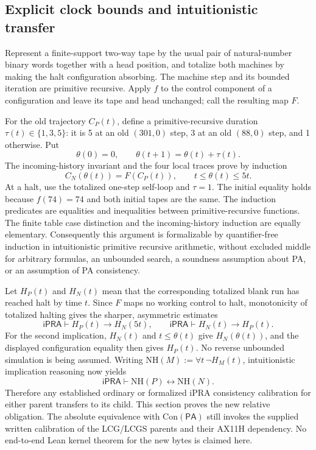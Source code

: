 \subsection{Explicit clock bounds and intuitionistic transfer}
Represent a finite-support two-way tape by the usual pair of natural-number
binary words together with a head position, and totalize both machines by
making the halt configuration absorbing.  The machine step and its bounded
iteration are primitive recursive.  Apply $f$ to the control component of
a configuration and leave its tape and head unchanged; call the resulting
map $F$.

For the old trajectory $C_P(t)$, define a primitive-recursive duration
$\tau(t)\in\{1,3,5\}$: it is 5 at an old $(301,0)$ step, 3 at an old
$(88,0)$ step, and 1 otherwise.  Put
\[
 \theta(0)=0,\qquad \theta(t+1)=\theta(t)+\tau(t).
\]
The incoming-history invariant and the four local traces prove by induction
\[
 C_N(\theta(t))=F(C_P(t)),\qquad t\leq\theta(t)\leq5t.
\]
At a halt, use the totalized one-step self-loop and $\tau=1$.
The initial equality holds because $f(74)=74$ and both initial tapes are
the same.  The induction predicates are equalities and inequalities between
primitive-recursive functions.  The finite table case distinction and the
incoming-history induction are equally elementary.  Consequently this
argument is formalizable by quantifier-free induction in intuitionistic
primitive recursive arithmetic, without excluded middle for arbitrary
formulas, an unbounded search, a soundness assumption about PA, or an
assumption of PA consistency.

Let $H_P(t)$ and $H_N(t)$ mean that the corresponding totalized blank run
has reached halt by time $t$.  Since $F$ maps no working control to halt,
monotonicity of totalized halting gives the sharper, asymmetric estimates
\[
 \mathsf{iPRA}\vdash H_P(t)\to H_N(5t),\qquad
 \mathsf{iPRA}\vdash H_N(t)\to H_P(t).
\]
For the second implication, $H_N(t)$ and $t\leq\theta(t)$ give
$H_N(\theta(t))$, and the displayed configuration equality then gives
$H_P(t)$.  No reverse unbounded simulation is being assumed.
Writing $\mathrm{NH}(M):=\forall t\,\neg H_M(t)$, intuitionistic implication
reasoning now yields
\[
 \mathsf{iPRA}\vdash\mathrm{NH}(P)\leftrightarrow\mathrm{NH}(N).
\]
Therefore any established ordinary or formalized iPRA consistency
calibration for either parent transfers to its child.  This section proves
the new relative obligation.  The absolute equivalence with
$\mathrm{Con}(\mathsf{PA})$ still invokes the supplied written calibration
of the LCG/LCGS parents and their AX11H dependency.  No end-to-end Lean
kernel theorem for the new bytes is claimed here.

